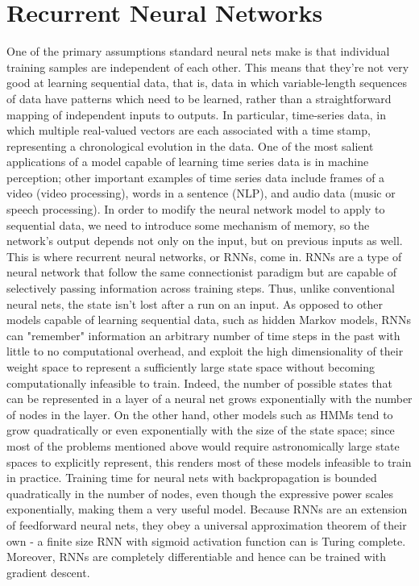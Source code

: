 \documentclass{article}
\begin{document}
\section{Recurrent Neural Networks}
One of the primary assumptions standard neural nets make is that individual training samples are independent of each other. This means that they're not very good at learning sequential data, that is, data in which variable-length sequences of data have patterns which need to be learned, rather than a straightforward mapping of independent inputs to outputs. In particular, time-series data, in which multiple real-valued vectors are each associated with a time stamp, representing a chronological evolution in the data. One of the most salient applications of a model capable of learning time series data is in machine perception; other important examples of time series data include frames of a video (video processing), words in a sentence (NLP), and audio data (music or speech processing).
\newline \newline
In order to modify the neural network model to apply to sequential data, we need to introduce some mechanism of memory, so the network's output depends not only on the input, but on previous inputs as well. This is where recurrent neural networks, or RNNs, come in. RNNs are a type of neural network that follow the same connectionist paradigm but are capable of selectively passing information across training steps. Thus, unlike conventional neural nets, the state isn't lost after a run on an input. As opposed to other models capable of learning sequential data, such as hidden Markov models, RNNs can "remember" information an arbitrary number of time steps in the past with little to no computational overhead, and exploit the high dimensionality of their weight space to represent a sufficiently large state space without becoming computationally infeasible to train. Indeed, the number of possible states that can be represented in a layer of a neural net grows exponentially with the number of nodes in the layer. On the other hand, other models such as HMMs tend to grow quadratically or even exponentially with the size of the state space; since most of the problems mentioned above would require astronomically large state spaces to explicitly represent, this renders most of these models infeasible to train in practice. Training time for neural nets with backpropagation is bounded quadratically in the number of nodes, even though the expressive power scales exponentially, making them a very useful model.
\newline \newline
Because RNNs are an extension of feedforward neural nets, they obey a universal approximation theorem of their own - a finite size RNN with sigmoid activation function can is Turing complete. Moreover, RNNs are completely differentiable and hence can be trained with gradient descent.
\end{document}
